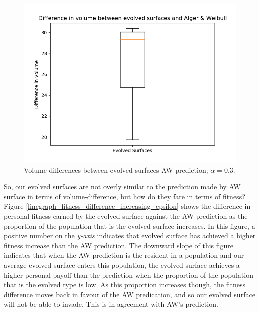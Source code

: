 \documentclass[11pt]{book}
\newcommand*{\np}{\par\noindent\newline}
\begin{document}
\begin{figure}
	\centering
	\includegraphics[scale=0.6]{resources/boxplot_volume_difference_symmetric_r_03.png}
	\caption{Volume-differences between evolved surfaces AW prediction; $\alpha = 0.3$.}
	\label{boxplot_volume_difference_symmetric_r_03}
\end{figure}


\np So, our evolved surfaces are not overly similar to the prediction made by AW surface in terms of volume-difference, but how do they fare in terms of fitness?
Figure \ref{linegraph_fitness_difference_increasing_epsilon} shows the difference in personal fitness earned by the evolved surface against the AW prediction as the proportion of the population  that is the evolved surface increases.
In this figure, a positive number on the \textit{y-axis} indicates that evolved surface has achieved a higher fitness increase than the AW prediction.
The downward slope of this figure indicates that when the AW prediction is the resident in a population and our average-evolved surface enters this population,
the evolved surface achieves a higher personal payoff than the prediction when the proportion of the population that is the evolved type is low.
As this proportion increases though, the fitness difference moves back in favour of the AW predication, and so our evolved surface will not be able to invade.
This is in agreement with AW's prediction.
\end{document}
